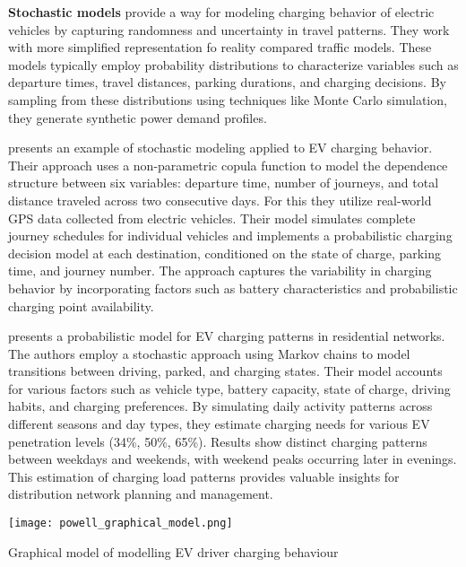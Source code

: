 \textbf{Stochastic models} provide a way for modeling charging behavior of electric vehicles by capturing randomness and uncertainty in travel patterns. They work with more simplified representation fo reality compared traffic models. These models typically employ probability distributions to characterize variables such as departure times, travel distances, parking durations, and charging decisions. By sampling from these distributions using techniques like Monte Carlo simulation, they generate synthetic power demand profiles.

 presents an example of stochastic modeling applied to EV charging behavior. Their approach uses a non-parametric copula function to model the dependence structure between six variables: departure time, number of journeys, and total distance traveled across two consecutive days. For this they utilize real-world GPS data collected from electric vehicles. Their model simulates complete journey schedules for individual vehicles and implements a probabilistic charging decision model at each destination, conditioned on the state of charge, parking time, and journey number. The approach captures the variability in charging behavior by incorporating factors such as battery characteristics and probabilistic charging point availability.

 presents a probabilistic model for EV charging patterns in residential networks. The authors employ a stochastic approach using Markov chains to model transitions between driving, parked, and charging states. Their model accounts for various factors such as vehicle type, battery capacity, state of charge, driving habits, and charging preferences. By simulating daily activity patterns across different seasons and day types, they estimate charging needs for various EV penetration levels (34\%, 50\%, 65\%). Results show distinct charging patterns between weekdays and weekends, with weekend peaks occurring later in evenings. This estimation of charging load patterns provides valuable insights for distribution network planning and management.



\begin{marginfigure}
    \texttt{[image: powell\_graphical\_model.png]}
    \caption{Graphical model of modelling EV driver charging behaviour \cite{powellChargingInfrastructureAccess2022}}
    \label{fig:powell_graphic_model}
\end{marginfigure}

